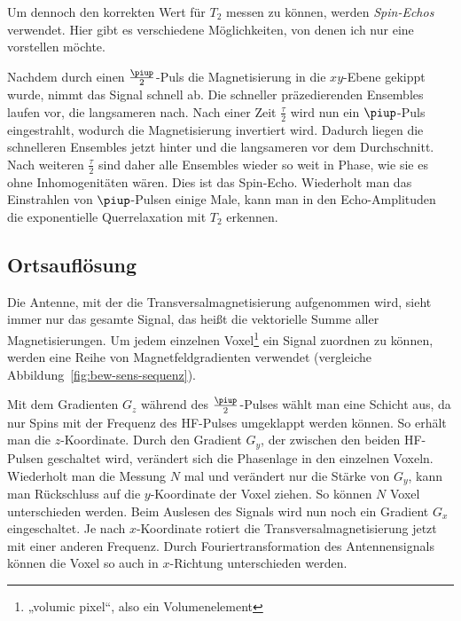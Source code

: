 \documentclass[
    11pt,
    ngerman
]{scrbook}
\begin{document}
Um dennoch den korrekten Wert für $T_2$ messen zu können, werden
\emph{Spin-Echos} verwendet. Hier gibt es verschiedene Möglichkeiten, von denen
ich nur eine vorstellen möchte.

Nachdem durch einen $\frac\piup2$-Puls die Magnetisierung in die $xy$-Ebene
gekippt wurde, nimmt das Signal schnell ab. Die schneller präzedierenden
Ensembles laufen vor, die langsameren nach. Nach einer Zeit $\frac\tau2$ wird
nun ein $\piup$-Puls eingestrahlt, wodurch die Magnetisierung invertiert wird.
Dadurch liegen die schnelleren Ensembles jetzt hinter und die langsameren vor
dem Durchschnitt. Nach weiteren $\frac\tau2$ sind daher alle Ensembles wieder
so weit in Phase, wie sie es ohne Inhomogenitäten wären. Dies ist das
Spin-Echo. Wiederholt man das Einstrahlen von $\piup$-Pulsen einige Male, kann
man in den Echo-Amplituden die exponentielle Querrelaxation mit $T_2$ erkennen.

\subsection{Ortsauflösung}

Die Antenne, mit der die Transversalmagnetisierung aufgenommen wird, sieht
immer nur das gesamte Signal, das heißt die vektorielle Summe aller
Magnetisierungen. Um jedem einzelnen Voxel\footnote{„volumic pixel“, also ein
Volumenelement} ein Signal zuordnen zu können, werden eine Reihe von
Magnetfeldgradienten verwendet (vergleiche
Abbildung~\ref{fig:bew-sens-sequenz}).

Mit dem Gradienten $G_z$ während des $\frac\piup2$-Pulses wählt man eine
Schicht aus, da nur Spins mit der Frequenz des HF-Pulses umgeklappt werden
können. So erhält man die $z$-Koordinate. Durch den Gradient $G_y$,
der zwischen den beiden HF-Pulsen geschaltet wird, verändert sich die
Phasenlage in den einzelnen Voxeln. Wiederholt man die Messung $N$ mal und
verändert nur die Stärke von $G_y$, kann man Rückschluss auf die $y$-Koordinate
der Voxel ziehen. So können $N$ Voxel unterschieden werden. Beim Auslesen des
Signals wird nun noch ein Gradient $G_x$ eingeschaltet. Je nach $x$-Koordinate
rotiert die Transversalmagnetisierung jetzt mit einer anderen Frequenz. Durch
Fouriertransformation des Antennensignals können die Voxel so auch in
$x$-Richtung unterschieden werden.
\end{document}
